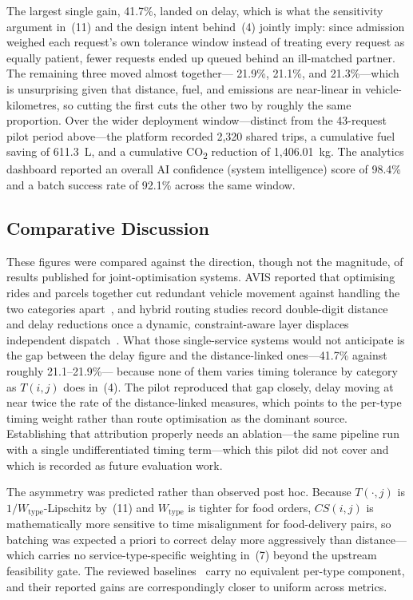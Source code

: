 \documentclass[conference]{IEEEtran}
\begin{document}
The largest single gain, 41.7\%, landed on delay, which is what the
sensitivity argument in~(11) and the design intent behind~(4) jointly imply:
since admission weighed each request's own tolerance window instead of
treating every request as equally patient, fewer requests ended up queued
behind an ill-matched partner. The remaining three moved almost together---
21.9\%, 21.1\%, and 21.3\%---which is unsurprising given that distance,
fuel, and emissions are near-linear in vehicle-kilometres, so cutting the
first cuts the other two by roughly the same proportion. Over the wider deployment window---distinct from the 43-request pilot
period above---the platform recorded 2,320 shared trips, a cumulative fuel
saving of 611.3~L, and a cumulative CO\textsubscript{2} reduction of
1,406.01~kg. The analytics dashboard reported an overall AI confidence
(system intelligence) score of 98.4\% and a batch success rate of 92.1\%
across the same window.

\subsection{Comparative Discussion}
These figures were compared against the direction, though not the magnitude,
of results published for joint-optimisation systems. AVIS reported that
optimising rides and parcels together cut redundant vehicle movement against
handling the two categories apart~\cite{zhang2022}, and hybrid routing studies
record double-digit distance and delay reductions once a dynamic,
constraint-aware layer displaces independent dispatch~\cite{lu,liu2025}. What
those single-service systems would not anticipate is the gap between the delay
figure and the distance-linked ones---41.7\% against roughly 21.1--21.9\%---
because none of them varies timing tolerance by category as $T(i,j)$ does
in~(4). The pilot reproduced that gap closely, delay moving at near twice the
rate of the distance-linked measures, which points to the per-type timing
weight rather than route optimisation as the dominant source. Establishing
that attribution properly needs an ablation---the same pipeline run with a
single undifferentiated timing term---which this pilot did not cover and which
is recorded as future evaluation work.

The asymmetry was predicted rather than observed post hoc. Because
$T(\cdot,j)$ is $1/W_{\text{type}}$-Lipschitz by~(11) and $W_{\text{type}}$
is tighter for food orders, $CS(i,j)$ is mathematically more sensitive to time
misalignment for food-delivery pairs, so batching was expected a priori to
correct delay more aggressively than distance---which carries no
service-type-specific weighting in~(7) beyond the upstream feasibility gate.
The reviewed baselines~\cite{zhang2022,lu,liu2025} carry no equivalent
per-type component, and their reported gains are correspondingly closer to
uniform across metrics.
\end{document}
